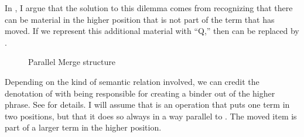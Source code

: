 \documentclass[output=paper]{langsci/langscibook}
\begin{document}
In \cite{Johnson2012}, I argue that the solution to this dilemma comes from
recognizing that there can be material in the higher position that is not part
of the term that has moved. If we represent this additional material with
``Q,'' then  can be replaced by .

\begin{figure}
    \caption{Parallel Merge structure\label{ex:multi2}}
\end{figure}
%

Depending on the kind of semantic relation involved, we can credit the
denotation of  with being responsible for creating a binder out of the
higher phrase. See \cite{Johnson2012} for details. I will assume that 
is an operation that puts one term in two positions, but that it does so always
in a way parallel to . The moved item is part of a larger term
in the higher position.
\end{document}
